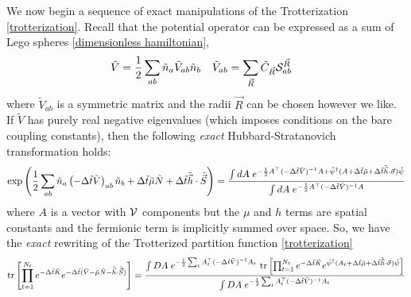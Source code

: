 We now begin a sequence of exact manipulations of the Trotterization \eqref{trotterization}.
Recall that the potential operator can be expressed as a sum of Lego spheres \eqref{dimensionless hamiltonian},
\begin{align}
	\tilde{V}
	&= \frac{1}{2} \sum_{ab} \tilde{n}_a \tilde{V}_{ab} \tilde{n}_b
	&
	\tilde{V}_{ab}
	&=
	\sum_{\vec{R}} \tilde{C}_{\vec{R}} \mathcal{S}^{\vec{R}}_{ab}
\end{align}
where $\tilde{V}_{ab}$ is a symmetric matrix and the radii $\vec{R}$ can be chosen however we like.
If $\tilde{V}$ has purely real negative eigenvalues (which imposes conditions on the bare coupling constants), then the following \emph{exact} Hubbard-Stratanovich transformation holds:
\begin{equation}
	\exp\left( \frac{1}{2} \sum_{ab}\tilde{n}_a \left(-\Delta\tilde{t} \tilde{V}\right)_{ab} \tilde{n}_b + \Delta \tilde{t} \tilde{\mu}\tilde{N} + \Delta\tilde{t} \tilde{\vec{h}}\cdot\tilde{\vec{S}}\right)
	=
	\frac{
		\int dA\; e^{-\frac{1}{2} A{}^{\top} (-\Delta\tilde{t} \tilde{V})^{-1} A + \tilde{\psi}{}^{\dagger} (A + \Delta\tilde{t} \tilde{\mu} + \Delta\tilde{t} \tilde{\vec{h}}\cdot\vec{\sigma}) \tilde{\psi}}
	}{
		\int dA\; e^{-\frac{1}{2} A{}^{\top} (-\Delta\tilde{t} \tilde{V})^{-1} A}
	}
\end{equation}
where $A$ is a vector with $\mathcal{V}$ components but the $\mu$ and $h$ terms are spatial constants and the fermionic term is implicitly summed over space.
So, we have the \emph{exact} rewriting of the Trotterized partition function \eqref{trotterization}
\begin{equation}
	\text{tr}\left[\prod_{t=1}^{N_t} e^{-\Delta \tilde{t}\tilde{K}}  e^{-\Delta \tilde{t}(\tilde{V} - \tilde{\mu}\tilde{N} - \tilde{\vec{h}}\cdot\tilde{\vec{S}})} \right]
	= 
	\frac{  
		\int DA\; e^{-\frac{1}{2} \sum_t A{}^{\top}_t (-\Delta\tilde{t} \tilde{V})^{-1} A_t}
	~	\text{tr}\left[\prod_{t=1}^{N_t} e^{-\Delta \tilde{t}\tilde{K}}  e^{ \tilde{\psi}{}^{\dagger} (A_t + \Delta\tilde{t} \tilde{\mu} + \Delta\tilde{t} \tilde{\vec{h}}\cdot\vec{\sigma})\tilde{\psi}} \right] 
	}{ 
		\int DA\; e^{-\frac{1}{2} \sum_t A{}^{\top}_t (-\Delta\tilde{t} \tilde{V})^{-1} A_t}
	}
	\label{eq:trotterization bilinearized}
\end{equation}

